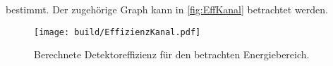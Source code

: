 bestimmt.
Der zugehörige Graph kann in \autoref{fig:EffKanal} betrachtet werden.







\begin{figure}[H]
    \centering
    \texttt{[image: build/EffizienzKanal.pdf]}
    \caption{Berechnete Detektoreffizienz für den betrachten Energiebereich.}
    \label{fig:EffKanal}
\end{figure}